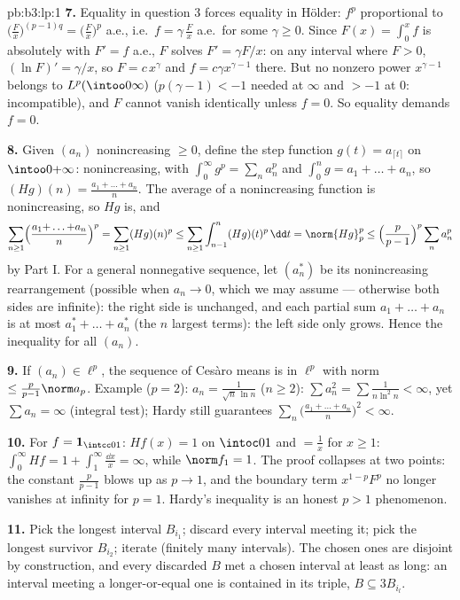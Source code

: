 \begin{solution}{pb:b3:lp:1}
\textbf{7.} Equality in question 3 forces equality in
H\"older: $f^p$ proportional to $\bigl(\frac Fx\bigr)^{(p-1)q}
= \bigl(\frac Fx\bigr)^p$ a.e., i.e.\ $f = \gamma\,\frac Fx$
a.e.\ for some $\gamma \geq 0$. Since $F(x) = \int_0^xf$ is
absolutely  with $F' = f$ a.e., $F$ solves $F' =
\gamma F/x$: on any interval where $F > 0$, $(\ln F)' =
\gamma/x$, so $F = c\,x^{\gamma}$ and $f = c\gamma
x^{\gamma - 1}$ there. But no nonzero power $x^{\gamma-1}$
belongs to $L^p(\intoo0\infty)$ ($p(\gamma - 1) < -1$ needed
at $\infty$ and $> -1$ at $0$: incompatible), and $F$ cannot
vanish identically unless $f = 0$. So equality demands $f =
0$.

\textbf{8.} Given $(a_n)$ nonincreasing $\geq 0$, define the
step function $g(t) = a_{\lceil t\rceil}$ on
$\intoo0{+\infty}$: nonincreasing, with $\int_0^\infty g^p =
\sum_na_n^p$ and $\int_0^ng = a_1 + \dots + a_n$, so
$(Hg)(n) = \frac{a_1 + \dots + a_n}n$. The average of a
nonincreasing function is nonincreasing, so $Hg$ is, and
\[
\sum_{n\geq1}\Bigl(\frac{a_1{+}\dots{+}a_n}n\Bigr)^p
= \sum_{n\geq1}(Hg)(n)^p
\leq \sum_{n\geq1}\int_{n-1}^n (Hg)(t)^p\,\dd t
= \norm{Hg}_p^p
\leq \Bigl(\frac p{p-1}\Bigr)^p\sum_n a_n^p
\]
by Part I. For a general nonnegative sequence, let $(a_n^*)$
be its nonincreasing rearrangement (possible when $a_n \to 0$,
which we may assume --- otherwise both sides are infinite):
the right side is unchanged, and each partial sum $a_1 + \dots
+ a_n$ is at most $a_1^* + \dots + a_n^*$ (the $n$ largest
terms): the left side only grows. Hence the inequality for all
$(a_n)$.

\textbf{9.} If $(a_n) \in \ell^p$, the sequence of Ces\`aro
means is in $\ell^p$ with norm $\leq \frac p{p-1}\norm
a_p$. Example ($p = 2$): $a_n = \frac1{\sqrt n\,\ln n}$ ($n
\geq 2$): $\sum a_n^2 = \sum\frac1{n\ln^2n} < \infty$, yet
$\sum a_n = \infty$ (integral test); Hardy still guarantees
$\sum_n\bigl(\frac{a_1 + \dots + a_n}n\bigr)^2 < \infty$.

\textbf{10.} For $f = \mathbf 1_{\intcc01}$: $Hf(x) = 1$ on
$\intoc01$ and $= \frac1x$ for $x \geq 1$: $\int_0^\infty Hf =
1 + \int_1^\infty\frac{\dd x}x = \infty$, while $\norm f_1 =
1$. The proof collapses at two points: the constant
$\frac p{p-1}$ blows up as $p \to 1$, and the boundary term
$x^{1-p}F^p$ no longer vanishes at infinity for $p = 1$.
Hardy's inequality is an honest $p > 1$ phenomenon.

\textbf{11.} Pick the longest interval $B_{i_1}$; discard
every interval meeting it; pick the longest survivor
$B_{i_2}$; iterate (finitely many intervals). The chosen ones
are disjoint by construction, and every discarded $B$ met a
chosen interval at least as long: an interval meeting a
longer-or-equal one is contained in its triple, $B \subseteq
3B_{i_l}$.


\end{solution}
